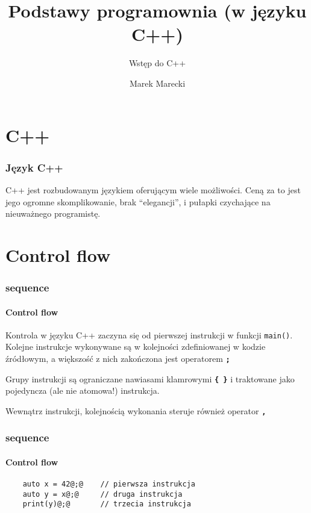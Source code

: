 \documentclass[aspectratio=169]{beamer}
\title{Podstawy programownia (w języku C++)}
\subtitle{Wstęp do C++}
\author{Marek Marecki}
\institute{Polsko-Japońska Akademia Technik Komputerowych}
\begin{document}
{%
    \frame{\titlepage}
}

\section{C++}

\begin{frame}
    \frametitle{Język C++}

    \begin{epigraphs}

    \end{epigraphs}

    C++ jest rozbudowanym językiem oferującym wiele możliwości. Ceną za to jest
    jego ogromne skomplikowanie, brak ``elegancji'', i pułapki czychające na
    nieuważnego programistę.
\end{frame}

\section{Control flow}

\begin{frame}
    \frametitle{sequence}
    \framesubtitle{Control flow}

    Kontrola w języku C++ zaczyna się od pierwszej instrukcji w funkcji
    {\tt main()}. Kolejne instrukcje wykonywane są w kolejności zdefiniowanej w
    kodzie źródłowym, a większość z nich zakończona jest operatorem \textbf{{\tt ;}}

    \vspace{1em}

    Grupy instrukcji są ograniczane nawiasami klamrowymi \textbf{{\tt \{ \}}} i
    traktowane jako pojedyncza (ale nie atomowa!) instrukcja.

    \vspace{1em}

    Wewnątrz instrukcji, kolejnością wykonania steruje również operator
    \textbf{{\tt ,}}
\end{frame}

\begin{frame}[fragile]
    \frametitle{sequence}
    \framesubtitle{Control flow}

    \begin{lstlisting}
    auto x = 42@;@    // pierwsza instrukcja
    auto y = x@;@     // druga instrukcja
    print(y)@;@       // trzecia instrukcja
    \end{lstlisting}
\end{frame}
\end{document}
